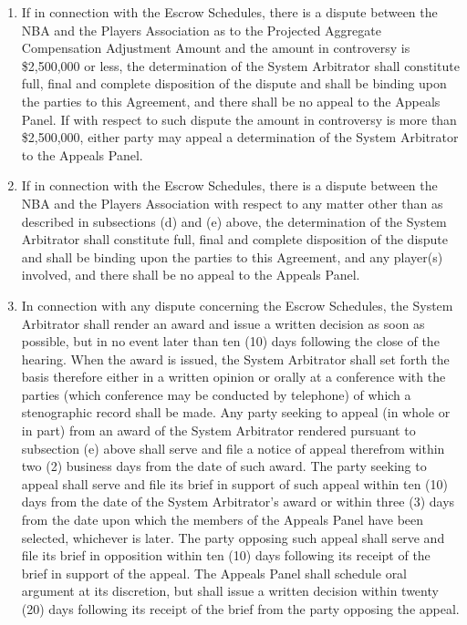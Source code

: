 \documentclass[
]{book}
\begin{document}
\begin{enumerate}
\item
  If in connection with the Escrow Schedules, there is a dispute between the NBA and the Players Association as to the Projected Aggregate Compensation Adjustment Amount and the amount in controversy is \$2,500,000 or less, the determination of the System Arbitrator shall constitute full, final and complete disposition of the dispute and shall be binding upon the parties to this Agreement, and there shall be no appeal to the Appeals Panel. If with respect to such dispute the amount in controversy is more than \$2,500,000, either party may appeal a determination of the System Arbitrator to the Appeals Panel.
\item
  If in connection with the Escrow Schedules, there is a dispute between the NBA and the Players Association with respect to any matter other than as described in subsections (d) and (e) above, the determination of the System Arbitrator shall constitute full, final and complete disposition of the dispute and shall be binding upon the parties to this Agreement, and any player(s) involved, and there shall be no appeal to the Appeals Panel.
\item
  In connection with any dispute concerning the Escrow Schedules, the System Arbitrator shall render an award and issue a written decision as soon as possible, but in no event later than ten (10) days following the close of the hearing. When the award is issued, the System Arbitrator shall set forth the basis therefore either in a written opinion or orally at a conference with the parties (which conference may be conducted by telephone) of which a stenographic record shall be made. Any party seeking to appeal (in whole or in part) from an award of the System Arbitrator rendered pursuant to subsection (e) above shall serve and file a notice of appeal therefrom within two (2) business days from the date of such award. The party seeking to appeal shall serve and file its brief in support of such appeal within ten (10) days from the date of the System Arbitrator's award or within three (3) days from the date upon which the members of the Appeals Panel have been selected, whichever is later. The party opposing such appeal shall serve and file its brief in opposition within ten (10) days following its receipt of the brief in support of the appeal. The Appeals Panel shall schedule oral argument at its discretion, but shall issue a written decision within twenty (20) days following its receipt of the brief from the party opposing the appeal.
\end{enumerate}
\end{document}
